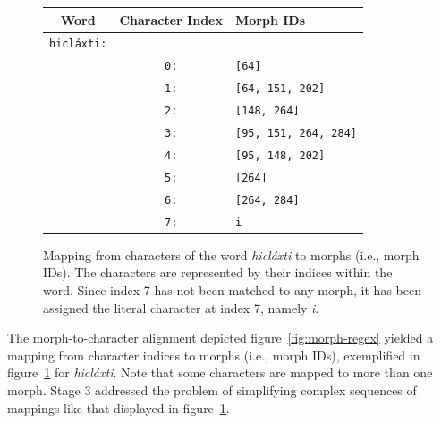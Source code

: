 {\begin{figure}[t]
\centering
\setlength{\extrarowheight}{6pt}
\begin{tabular}{ccl}
\toprule
Word & Character Index & Morph IDs\\
\midrule
\texttt{hicl\'{a}xti:} & &\\
&  \texttt{0:} & \texttt{[64]} \\
& \texttt{1:} & \texttt{[64, 151, 202]} \\
& \texttt{2:} & \texttt{[148, 264]} \\
& \texttt{3:} & \texttt{[95, 151, 264, 284]} \\
& \texttt{4:} & \texttt{[95, 148, 202]} \\
& \texttt{5:} & \texttt{[264]} \\
& \texttt{6:} & \texttt{[264, 284]} \\
& \texttt{7:} & \texttt{i} \\
\bottomrule
\end{tabular}
\label{fig:chars-to-morphs-tab}
\caption{Mapping from characters of the word \textit{hicl\'{a}xti} to morphs (i.e., morph IDs). The characters are represented by their indices within the word. Since index 7 has not been matched to any morph, it has been assigned the literal character at index 7, namely \textit{i}.}
\end{figure}

The morph-to-character alignment depicted figure~\ref{fig:morph-regex} yielded
a mapping from character indices to morphs (i.e., morph IDs), exemplified in 
figure~\ref{fig:chars-to-morphs-tab} for \textit{hicl\'{a}xti}. Note that
some characters are mapped to more than one morph. 
Stage 3 addressed the problem of simplifying complex sequences of mappings 
like that displayed in figure~\ref{fig:chars-to-morphs-tab}.

}
